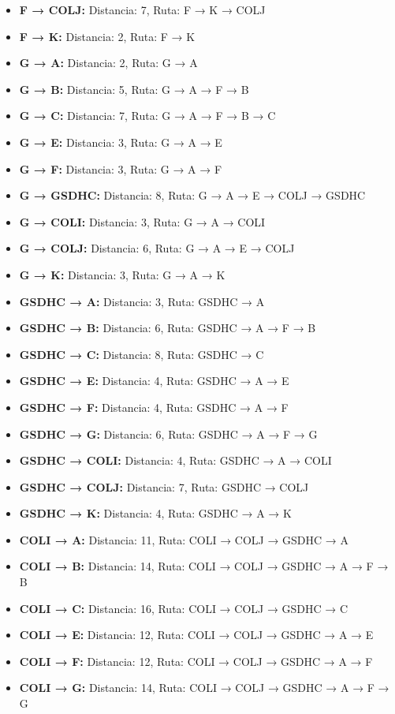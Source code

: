 \documentclass[12pt]{article}
\begin{document}
\begin{itemize}
\item \textbf{F → COLJ:} Distancia: 7, Ruta: F → K → COLJ
\item \textbf{F → K:} Distancia: 2, Ruta: F → K
\item \textbf{G → A:} Distancia: 2, Ruta: G → A
\item \textbf{G → B:} Distancia: 5, Ruta: G → A → F → B
\item \textbf{G → C:} Distancia: 7, Ruta: G → A → F → B → C
\item \textbf{G → E:} Distancia: 3, Ruta: G → A → E
\item \textbf{G → F:} Distancia: 3, Ruta: G → A → F
\item \textbf{G → GSDHC:} Distancia: 8, Ruta: G → A → E → COLJ → GSDHC
\item \textbf{G → COLI:} Distancia: 3, Ruta: G → A → COLI
\item \textbf{G → COLJ:} Distancia: 6, Ruta: G → A → E → COLJ
\item \textbf{G → K:} Distancia: 3, Ruta: G → A → K
\item \textbf{GSDHC → A:} Distancia: 3, Ruta: GSDHC → A
\item \textbf{GSDHC → B:} Distancia: 6, Ruta: GSDHC → A → F → B
\item \textbf{GSDHC → C:} Distancia: 8, Ruta: GSDHC → C
\item \textbf{GSDHC → E:} Distancia: 4, Ruta: GSDHC → A → E
\item \textbf{GSDHC → F:} Distancia: 4, Ruta: GSDHC → A → F
\item \textbf{GSDHC → G:} Distancia: 6, Ruta: GSDHC → A → F → G
\item \textbf{GSDHC → COLI:} Distancia: 4, Ruta: GSDHC → A → COLI
\item \textbf{GSDHC → COLJ:} Distancia: 7, Ruta: GSDHC → COLJ
\item \textbf{GSDHC → K:} Distancia: 4, Ruta: GSDHC → A → K
\item \textbf{COLI → A:} Distancia: 11, Ruta: COLI → COLJ → GSDHC → A
\item \textbf{COLI → B:} Distancia: 14, Ruta: COLI → COLJ → GSDHC → A → F → B
\item \textbf{COLI → C:} Distancia: 16, Ruta: COLI → COLJ → GSDHC → C
\item \textbf{COLI → E:} Distancia: 12, Ruta: COLI → COLJ → GSDHC → A → E
\item \textbf{COLI → F:} Distancia: 12, Ruta: COLI → COLJ → GSDHC → A → F
\item \textbf{COLI → G:} Distancia: 14, Ruta: COLI → COLJ → GSDHC → A → F → G

\end{itemize}
\end{document}
